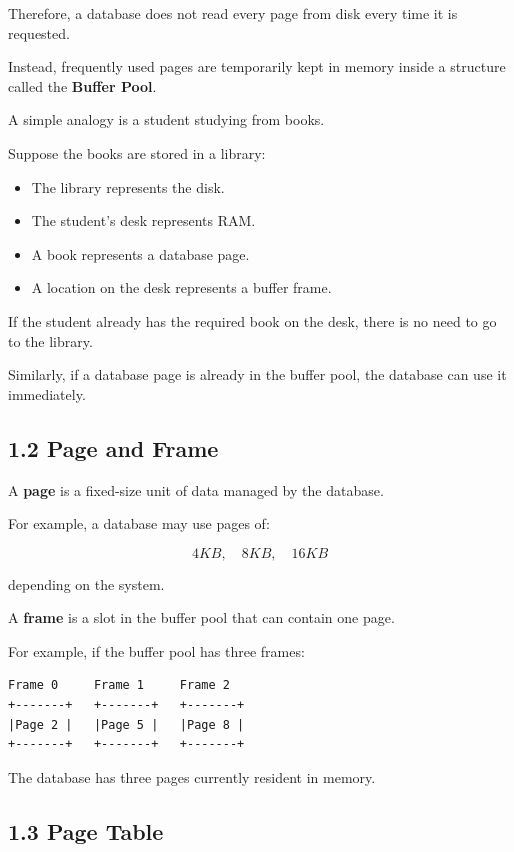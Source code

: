 \documentclass[12pt,a4paper]{article}
\begin{document}
Therefore, a database does not read every page from disk every time it is requested.

Instead, frequently used pages are temporarily kept in memory inside a structure called the \textbf{Buffer Pool}.

A simple analogy is a student studying from books.

Suppose the books are stored in a library:

\begin{itemize}
    \item The library represents the disk.
    \item The student's desk represents RAM.
    \item A book represents a database page.
    \item A location on the desk represents a buffer frame.
\end{itemize}

If the student already has the required book on the desk, there is no need to go to the library.

Similarly, if a database page is already in the buffer pool, the database can use it immediately.

\subsection{1.2 Page and Frame}

A \textbf{page} is a fixed-size unit of data managed by the database.

For example, a database may use pages of:

\[
4KB,\quad 8KB,\quad 16KB
\]

depending on the system.

A \textbf{frame} is a slot in the buffer pool that can contain one page.

For example, if the buffer pool has three frames:

\begin{verbatim}
Frame 0     Frame 1     Frame 2
+-------+   +-------+   +-------+
|Page 2 |   |Page 5 |   |Page 8 |
+-------+   +-------+   +-------+
\end{verbatim}

The database has three pages currently resident in memory.

\subsection{1.3 Page Table}
\end{document}
